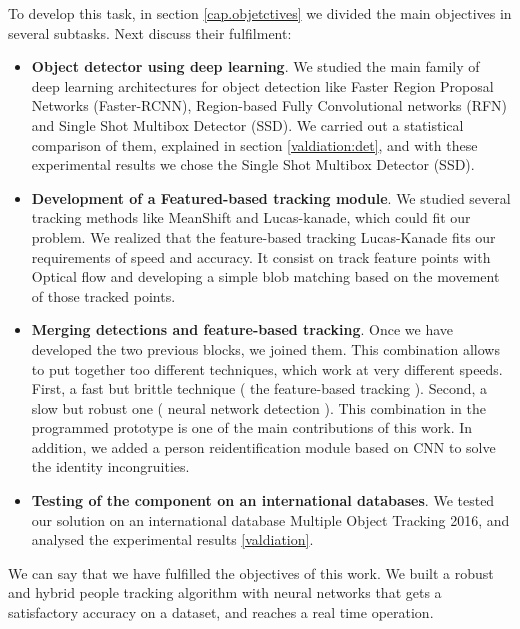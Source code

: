 To develop this task, in section \ref{cap.objetctives} we divided the main objectives in several subtasks. Next discuss their fulfilment:

\begin{itemize}

\item \textbf{Object detector using deep learning}. We studied the main family of deep learning architectures for object detection like Faster Region Proposal Networks (Faster-RCNN), Region-based Fully Convolutional networks (RFN) and Single Shot Multibox Detector (SSD). We carried out a statistical comparison of them, explained in section \ref{valdiation:det}, and with these experimental results we chose the Single Shot Multibox Detector (SSD).


\item \textbf{Development of a Featured-based tracking module}. We studied several tracking methods like MeanShift and Lucas-kanade, which could fit our problem. We realized that the feature-based tracking Lucas-Kanade fits our requirements of speed and accuracy. It consist on track feature points with Optical flow and developing a simple blob matching based on the movement of those tracked points.




\item \textbf{Merging detections and feature-based tracking}. Once we have developed the two previous blocks, we joined them. This combination allows to put together too different techniques, which work at very different speeds. First, a fast but brittle technique ( the feature-based tracking ). Second, a slow but robust one ( neural network detection ). This combination in the programmed prototype is one of the main contributions of this work. In addition, we added a person reidentification module based on CNN to solve the identity incongruities.

\item \textbf{Testing of the component on an international databases}. We tested our solution on an international database Multiple Object Tracking 2016, and analysed the experimental results \ref{valdiation}.


\end{itemize}

We can say that we have fulfilled the objectives of this work. We built a robust and hybrid people tracking algorithm with neural networks that gets a satisfactory accuracy on a dataset, and reaches a real time operation.





